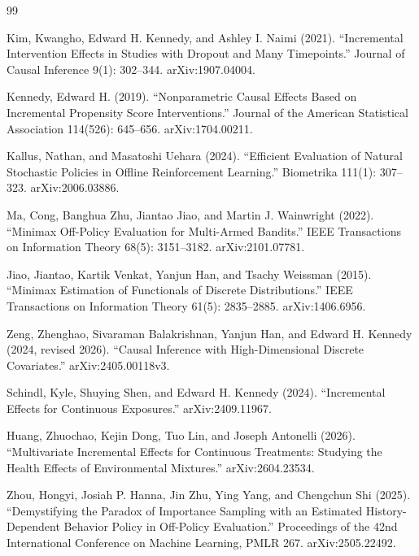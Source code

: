 \documentclass{article}
\begin{document}
\begin{thebibliography}{99}

   Kim, Kwangho, Edward H. Kennedy, and Ashley I. Naimi (2021). ``Incremental Intervention Effects in Studies with Dropout and Many Timepoints.'' Journal of Causal Inference 9(1): 302--344. arXiv:1907.04004.

   Kennedy, Edward H. (2019). ``Nonparametric Causal Effects Based on Incremental Propensity Score Interventions.'' Journal of the American Statistical Association 114(526): 645--656. arXiv:1704.00211.

   Kallus, Nathan, and Masatoshi Uehara (2024). ``Efficient Evaluation of Natural Stochastic Policies in Offline Reinforcement Learning.'' Biometrika 111(1): 307--323. arXiv:2006.03886.

   Ma, Cong, Banghua Zhu, Jiantao Jiao, and Martin J. Wainwright (2022). ``Minimax Off-Policy Evaluation for Multi-Armed Bandits.'' IEEE Transactions on Information Theory 68(5): 3151--3182. arXiv:2101.07781.

   Jiao, Jiantao, Kartik Venkat, Yanjun Han, and Tsachy Weissman (2015). ``Minimax Estimation of Functionals of Discrete Distributions.'' IEEE Transactions on Information Theory 61(5): 2835--2885. arXiv:1406.6956.

   Zeng, Zhenghao, Sivaraman Balakrishnan, Yanjun Han, and Edward H. Kennedy (2024, revised 2026). ``Causal Inference with High-Dimensional Discrete Covariates.'' arXiv:2405.00118v3.

   Schindl, Kyle, Shuying Shen, and Edward H. Kennedy (2024). ``Incremental Effects for Continuous Exposures.'' arXiv:2409.11967.

   Huang, Zhuochao, Kejin Dong, Tuo Lin, and Joseph Antonelli (2026). ``Multivariate Incremental Effects for Continuous Treatments: Studying the Health Effects of Environmental Mixtures.'' arXiv:2604.23534.

   Zhou, Hongyi, Josiah P. Hanna, Jin Zhu, Ying Yang, and Chengchun Shi (2025). ``Demystifying the Paradox of Importance Sampling with an Estimated History-Dependent Behavior Policy in Off-Policy Evaluation.'' Proceedings of the 42nd International Conference on Machine Learning, PMLR 267. arXiv:2505.22492.


\end{thebibliography}
\end{document}
